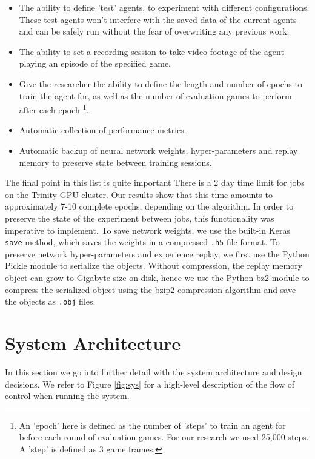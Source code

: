 \begin{itemize}
    \item The ability to define 'test' agents, to experiment with different configurations. These test agents won't interfere with the saved data of the current agents and can be safely run without the fear of overwriting any previous work.
    \item The ability to set a recording session to take video footage of the agent playing an episode of the specified game.
    \item Give the researcher the ability to define the length and number of epochs to train the agent for, as well as the number of evaluation games to perform after each epoch \footnote{An 'epoch' here is defined as the number of 'steps' to train an agent for before each round of evaluation games. For our research we used 25,000 steps. A 'step' is defined as 3 game frames.}.
    \item Automatic collection of performance metrics.
    \item Automatic backup of neural network weights, hyper-parameters and replay memory to preserve state between training sessions.
\end{itemize}

The final point in this list is quite important There is a 2 day time limit for jobs on the Trinity GPU cluster. Our results show that this time amounts to approximately 7-10 complete epochs, depending on the algorithm. In order to preserve the state of the experiment between jobs, this functionality was imperative to implement. To save network weights, we use the built-in Keras \texttt{save} method, which saves the weights in a compressed \texttt{.h5} file format. To preserve network hyper-parameters and experience replay, we first use the Python Pickle module \cite{pickle} to serialize the objects. Without compression, the replay memory object can grow to Gigabyte size on disk, hence we use the Python bz2 module \cite{bz2} to compress the serialized object using the bzip2 compression algorithm and save the objects as \texttt{.obj} files.

\section{System Architecture}
In this section we go into further detail with the system architecture and design decisions. We refer to Figure \ref{fig:sys} for a high-level description of the flow of control when running the system.

